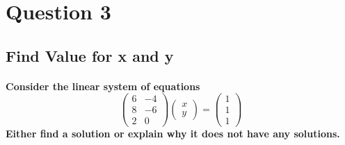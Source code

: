 \section{Question 3}
\subsection{Find Value for x and y}
\paragraph{Consider the linear system of equations
    $$ \begin{pmatrix}
            6 & -4 \\
            8 & -6 \\
            2 & 0
        \end{pmatrix} \begin{pmatrix}
            x \\
            y
        \end{pmatrix} = \begin{pmatrix}
            1 \\
            1 \\
            1
        \end{pmatrix} $$
    Either find a solution or explain why it does not have any solutions.
}

